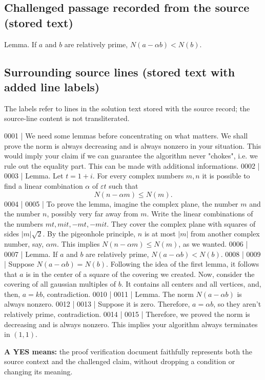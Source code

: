\documentclass[11pt]{article}
\begin{document}
\subsection*{Challenged passage recorded from the source (stored text)}
\begin{Vsrc}
Lemma. If $a$ and $b$ are relatively prime, $N(a-\alpha b)\lt N(b)$.
\end{Vsrc}
\subsection*{Surrounding source lines (stored text with added line labels)}
The labels refer to lines in the solution text stored with the source record; the source-line content is not transliterated.
\begin{Vsrc}
0001 | We need some lemmas before concentrating on what matters. We shall prove the norm is always decreasing and is always nonzero in your situation. This would imply your claim if we can guarantee the algorithm never "chokes", i.e. we rule out the equality part. This can be made with additional informations.
0002 | 
0003 | Lemma. Let $t=1+i$. For every complex numbers $m,n$ it is possible to find a linear combination $\alpha$ of $\varepsilon t$ such that $$N(n-\alpha m)\leqslant N(m).$$
0004 | 
0005 | To prove the lemma, imagine the complex plane, the number $m$ and the number $n$, possibly very far away from $m$. Write the linear combinations of the numbers $mt, mit, -mt, -mit$. They cover the complex plane with squares of sides $|m|\sqrt{2}$. By the pigeonhole principle, $n$ is at most $|m|$ from another complex number, say, $\alpha m$. This implies $N(n-\alpha m)\leqslant N(m)$, as we wanted. 
0006 | 
0007 | Lemma. If $a$ and $b$ are relatively prime, $N(a-\alpha b)\lt N(b)$.
0008 | 
0009 | Suppose $N(a-\alpha b)=N(b)$. Following the idea of the first lemma, it follows that $a$ is in the center of a square of the covering we created. Now, consider the covering of all gaussian multiples of $b$. It contains all centers and all vertices, and, then, $a=kb$, contradiction.
0010 | 
0011 | Lemma. The norm $N(a-\alpha b)$ is always nonzero.
0012 | 
0013 | Suppose it is zero. Therefore, $a=\alpha b$, so they aren't relatively prime, contradiction.
0014 | 
0015 | Therefore, we proved the norm is decreasing and is always nonzero. This implies your algorithm always terminates in $(1,1)$.
\end{Vsrc}
\textbf{A YES means:} the proof verification document faithfully represents both the source context and the challenged claim, without dropping a condition or changing its meaning.
\end{document}
